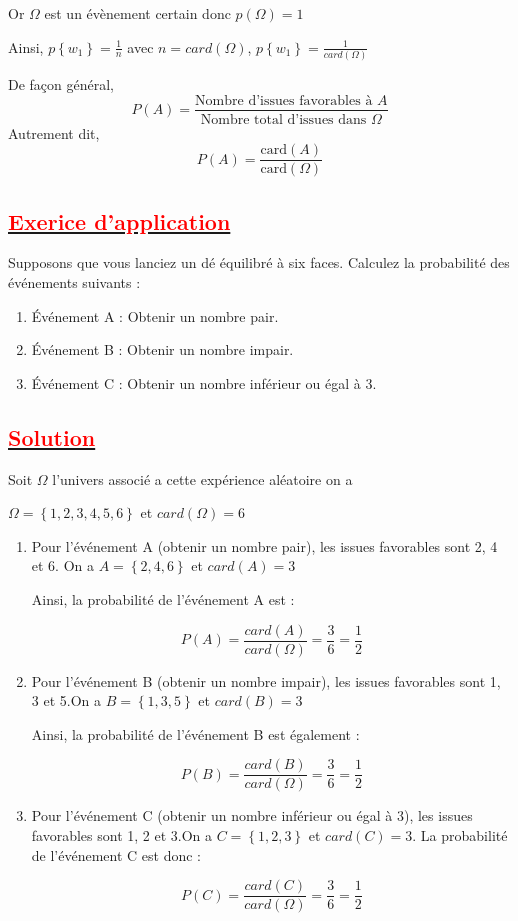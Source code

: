 \documentclass[12pt,a4paper]{article}
\begin{document}
Or $\Omega$ est un évènement certain donc $p(\Omega)=1$

Ainsi, $p\left\lbrace w_{1} \right\rbrace=\frac{1}{n}$ avec $n=card(\Omega)$, 
$p\left\lbrace w_{1} \right\rbrace=\frac{1}{card(\Omega)}$

De façon général, \[ P(A) = \frac{\text{Nombre d'issues favorables à } A}{\text{Nombre total d'issues dans } \Omega} \]
Autrement dit, \[ P(A) = \frac{\text{card} (A)}{\text{card} (\Omega)} \]
\subsection*{\underline{\textbf{\textcolor{red}{Exerice d'application}}}}
Supposons que vous lanciez un dé équilibré à six faces. Calculez la probabilité des événements suivants :

\begin{enumerate}
    \item Événement A : Obtenir un nombre pair.
    \item Événement B : Obtenir un nombre impair.
    \item Événement C : Obtenir un nombre inférieur ou égal à 3.
\end{enumerate}

\subsection*{\underline{\textbf{\textcolor{red}{Solution}}}}
Soit $\Omega$ l'univers associé a cette expérience aléatoire on a

$\Omega=\left\lbrace 1, 2, 3, 4, 5, 6 \right\rbrace $ et $card(\Omega)=6$ 

\begin{enumerate}
    \item Pour l'événement A (obtenir un nombre pair), les issues favorables sont 2, 4 et 6.
      On a $A=\left\lbrace 2, 4, 6 \right\rbrace $ et $card(A)=3$
          
     Ainsi, la probabilité de l'événement A est :
    
    \[ P(A) =\frac{card(A)}{card(\Omega)}=\frac{3}{6} = \frac{1}{2} \]
    
    \item Pour l'événement B (obtenir un nombre impair), les issues favorables sont 1, 3 et 5.On a $B=\left\lbrace 1, 3, 5 \right\rbrace $ et $card(B)=3$
    
     Ainsi, la probabilité de l'événement B est également :
    
    \[ P(B) =\frac{card(B)}{card(\Omega)}=\frac{3}{6} = \frac{1}{2} \]
    
    \item Pour l'événement C (obtenir un nombre inférieur ou égal à 3), les issues favorables sont 1, 2 et 3.On a $C=\left\lbrace 1, 2, 3 \right\rbrace $ et $card(C)=3$.
    La probabilité de l'événement C est donc :
    
    \[ P(C) =\frac{card(C)}{card(\Omega)}=\frac{3}{6} = \frac{1}{2} \]
\end{enumerate}
\end{document}
